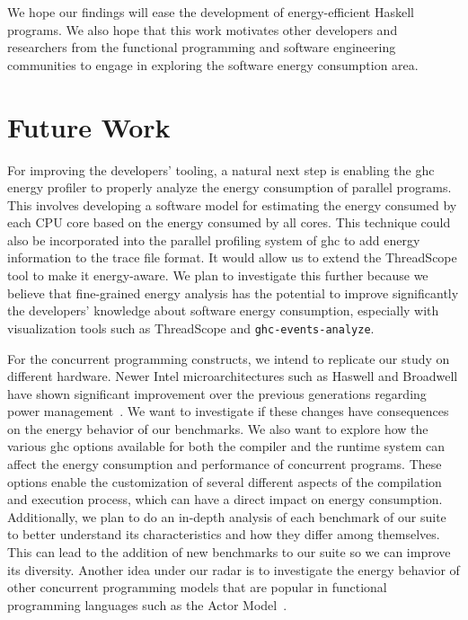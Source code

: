 We hope our findings will ease the development of energy-efficient Haskell programs. We also hope that this work motivates other developers and researchers from the functional programming and software engineering communities to engage in exploring the software energy consumption area.


\section{Future Work}
For improving the developers' tooling, a natural next step is enabling the \ac{ghc} energy profiler to properly analyze the energy consumption of parallel programs. This involves developing a software model for estimating the energy consumed by each CPU core based on the energy consumed by all cores. This technique could also be incorporated into the parallel profiling system of \ac{ghc} to add energy information to the trace file format. It would allow us to extend the ThreadScope tool to make it energy-aware. We plan to investigate this further because we believe that fine-grained energy analysis has the potential to improve significantly the developers' knowledge about software energy consumption, especially with visualization tools such as ThreadScope and \texttt{ghc-events-analyze}.

For the concurrent programming constructs, we intend to replicate our study on different hardware. Newer Intel microarchitectures such as Haswell and Broadwell have shown significant improvement over the previous generations regarding power management~\cite{huang:2015}. We want to investigate if these changes have consequences on the energy behavior of our benchmarks. We also want to explore how the various \ac{ghc} options available for both the compiler and the runtime system can affect the energy consumption and performance of concurrent programs. These options enable the customization of several different aspects of the compilation and execution process, which can have a direct impact on energy consumption. Additionally, we plan to do an in-depth analysis of each benchmark of our suite to better understand its characteristics and how they differ among themselves. This can lead to the addition of new benchmarks to our suite so we can improve its diversity. Another idea under our radar is to investigate the energy behavior of other concurrent programming models that are popular in functional programming languages such as the Actor Model~\cite{agha:1986}.
